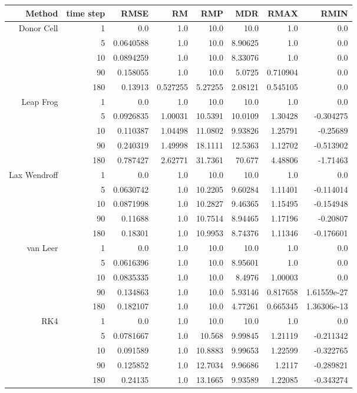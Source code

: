 \begin{tabular}{rrrrrrrr}
  \hline
  \textbf{Method} & \textbf{time step} & \textbf{RMSE} & \textbf{RM} & \textbf{RMP} & \textbf{MDR} & \textbf{RMAX} & \textbf{RMIN} \\\hline
  Donor Cell & 1 & 0.0 & 1.0 & 10.0 & 10.0 & 1.0 & 0.0 \\
   & 5 & 0.0640588 & 1.0 & 10.0 & 8.90625 & 1.0 & 0.0 \\
   & 10 & 0.0894259 & 1.0 & 10.0 & 8.33076 & 1.0 & 0.0 \\
   & 90 & 0.158055 & 1.0 & 10.0 & 5.0725 & 0.710904 & 0.0 \\
   & 180 & 0.13913 & 0.527255 & 5.27255 & 2.08121 & 0.545105 & 0.0 \\
  Leap Frog & 1 & 0.0 & 1.0 & 10.0 & 10.0 & 1.0 & 0.0 \\
   & 5 & 0.0926835 & 1.00031 & 10.5391 & 10.0109 & 1.30428 & -0.304275 \\
   & 10 & 0.110387 & 1.04498 & 11.0802 & 9.93826 & 1.25791 & -0.25689 \\
   & 90 & 0.240319 & 1.49998 & 18.1111 & 12.5363 & 1.12702 & -0.513902 \\
   & 180 & 0.787427 & 2.62771 & 31.7361 & 70.677 & 4.48806 & -1.71463 \\
  Lax Wendroff & 1 & 0.0 & 1.0 & 10.0 & 10.0 & 1.0 & 0.0 \\
   & 5 & 0.0630742 & 1.0 & 10.2205 & 9.60284 & 1.11401 & -0.114014 \\
   & 10 & 0.0871998 & 1.0 & 10.2827 & 9.46365 & 1.15495 & -0.154948 \\
   & 90 & 0.11688 & 1.0 & 10.7514 & 8.94465 & 1.17196 & -0.20807 \\
   & 180 & 0.18301 & 1.0 & 10.9953 & 8.74376 & 1.11346 & -0.176601 \\
  van Leer & 1 & 0.0 & 1.0 & 10.0 & 10.0 & 1.0 & 0.0 \\
   & 5 & 0.0616396 & 1.0 & 10.0 & 8.95601 & 1.0 & 0.0 \\
   & 10 & 0.0835335 & 1.0 & 10.0 & 8.4976 & 1.00003 & 0.0 \\
   & 90 & 0.134863 & 1.0 & 10.0 & 5.93146 & 0.817658 & 1.61559e-27 \\
   & 180 & 0.182107 & 1.0 & 10.0 & 4.77261 & 0.665345 & 1.36306e-13 \\
  RK4 & 1 & 0.0 & 1.0 & 10.0 & 10.0 & 1.0 & 0.0 \\
   & 5 & 0.0781667 & 1.0 & 10.568 & 9.99845 & 1.21119 & -0.211342 \\
   & 10 & 0.091589 & 1.0 & 10.8883 & 9.99653 & 1.22599 & -0.322765 \\
   & 90 & 0.125852 & 1.0 & 12.7034 & 9.96686 & 1.2117 & -0.289821 \\
   & 180 & 0.24135 & 1.0 & 13.1665 & 9.93589 & 1.22085 & -0.343274 \\\hline
\end{tabular}
